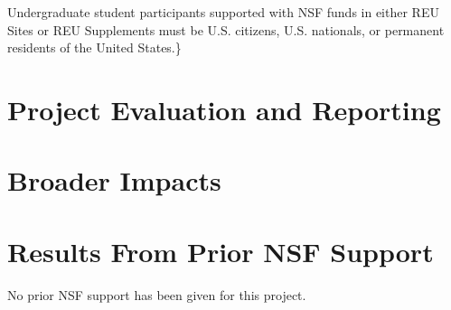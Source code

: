 Undergraduate student participants supported with NSF funds in either
REU Sites or REU Supplements must be U.S. citizens, U.S. nationals, or
permanent residents of the United States.\}

\section{Project Evaluation and Reporting}

\section{Broader Impacts}

\section{Results From Prior NSF Support}

No prior NSF support has been given for this project.
